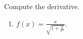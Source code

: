 Compute the derivative.
\begin{multicols}{2}
\begin{enumerate}[ref={\fcProblemRef}]

\item\label{problemDifferentialtexDivsqrt(1+2divx^2)}  $f(x)=\frac{x }{\sqrt{1+\frac{2}{x^2}}}$.

\end{enumerate}
\end{multicols}
